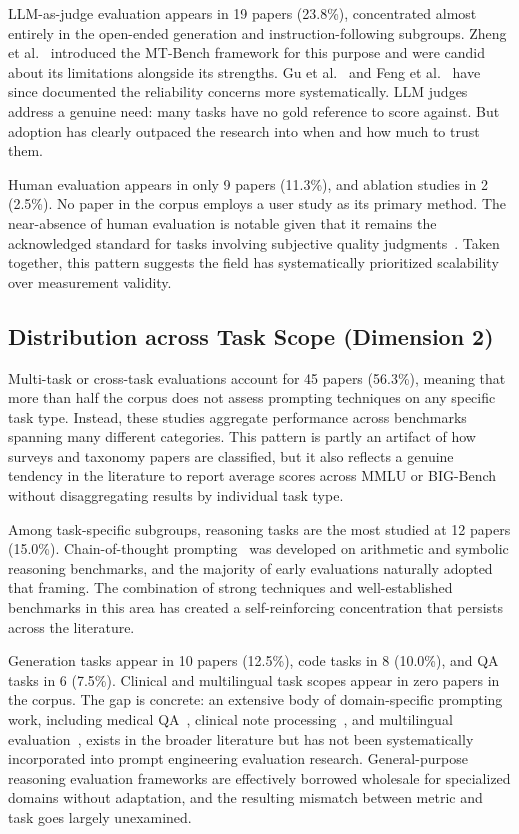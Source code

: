 \documentclass[journal]{IEEEtran}
\begin{document}
LLM-as-judge evaluation appears in 19 papers (23.8\%), concentrated
almost entirely in the open-ended generation and instruction-following
subgroups. Zheng et al.~\cite{zheng2023judging} introduced the MT-Bench
framework for this purpose and were candid about its limitations alongside
its strengths. Gu et al.~\cite{gu2025llmjudge} and Feng et al.~\cite{feng2025sage}
have since documented the reliability concerns more systematically. LLM judges
address a genuine need: many tasks have no gold reference to score against.
But adoption has clearly outpaced the research into when and how much to
trust them.

Human evaluation appears in only 9 papers (11.3\%), and ablation
studies in 2 (2.5\%). No paper in the corpus employs a user study as
its primary method. The near-absence of human evaluation is notable
given that it remains the acknowledged standard for tasks involving
subjective quality judgments~\cite{chang2023survey}. Taken together, this
pattern suggests the field has systematically prioritized scalability over
measurement validity.

\subsection{Distribution across Task Scope (Dimension 2)}

Multi-task or cross-task evaluations account for 45 papers (56.3\%),
meaning that more than half the corpus does not assess prompting
techniques on any specific task type. Instead, these studies aggregate
performance across benchmarks spanning many different categories. This pattern
is partly an artifact of how surveys and taxonomy papers are classified, but it also reflects
a genuine tendency in the literature to report average scores across
MMLU or BIG-Bench without disaggregating results by individual task type.

Among task-specific subgroups, reasoning tasks are the most studied
at 12 papers (15.0\%). Chain-of-thought prompting~\cite{wei2022chain}
was developed on arithmetic and symbolic reasoning benchmarks, and the
majority of early evaluations naturally adopted that framing. The combination of
strong techniques and well-established benchmarks in this area has created a
self-reinforcing concentration that persists across the literature.

Generation tasks appear in 10 papers (12.5\%), code tasks in 8
(10.0\%), and QA tasks in 6 (7.5\%). Clinical and multilingual task
scopes appear in zero papers in the corpus. The gap is concrete: an
extensive body of domain-specific prompting work, including medical
QA~\cite{clinicalnlp2024}, clinical note processing~\cite{medicalcot2025}, and
multilingual evaluation~\cite{vatsal2024survey}, exists in the broader
literature but has not been systematically incorporated into prompt
engineering evaluation research. General-purpose reasoning evaluation
frameworks are effectively borrowed wholesale for specialized domains
without adaptation, and the resulting mismatch between metric and task
goes largely unexamined.
\end{document}
